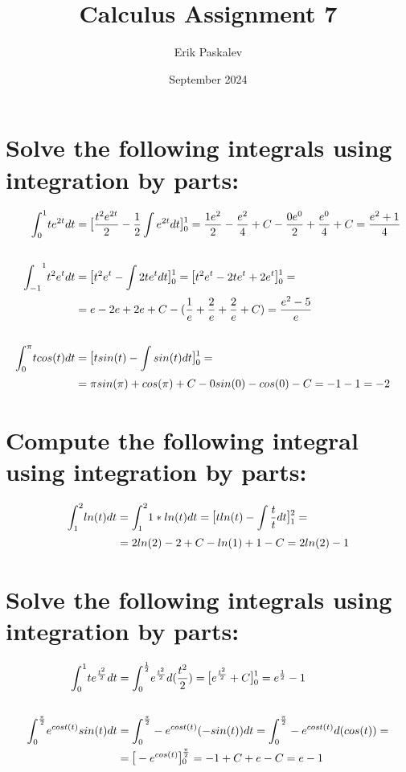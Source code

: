 \documentclass{article}
\title{Calculus Assignment 7}
\author{Erik Paskalev}
\date{September 2024}
\begin{document}
\maketitle

\section{\normalfont Solve the following integrals using integration by parts:}

\begin{equation}
\begin{split}
{\int_0}^1 te^{2t} dt & = \mathlarger{[}\frac{t^2e^{2t}}{2} - \frac{1}{2}\int e^{2t} dt\mathlarger{]}_0^1 = \frac{1e^2}{2} - \frac{e^2}{4} + C - \frac{0e^0}{2} + \frac{e^0}{4} + C = \frac{e^2 + 1}{4} \\ \\
{\int_{-1}}^1 t^2e^t dt & = \mathlarger{[}t^2e^t - \int 2te^t dt \mathlarger{]}_0^1 = \mathlarger{[}t^2e^t - 2te^t + 2e^t\mathlarger{]}_0^1 = \\ 
& = e - 2e + 2e + C - (\frac{1}{e} + \frac{2}{e} + \frac{2}{e} + C) = \frac{e^2 - 5}{e} \\ \\
{\int_0}^{\pi} tcos(t) dt & = \mathlarger{[}tsin(t) - \int sin(t) dt \mathlarger{]}_0^1 = \\ 
& = \pi sin(\pi) + cos(\pi) + C - 0sin(0) - cos(0) - C = -1 - 1 = -2
\end{split}    
\end{equation}

\section{\normalfont Compute the following integral using integration by parts:}

\begin{equation}
\begin{split}
{\int_1}^2 ln(t) dt & = {\int_1}^2 1*ln(t) dt = \mathlarger{[} tln(t) - \int \frac{t}{t} dt \mathlarger{]}_1^2 = \\ 
& = 2ln(2) - 2 + C - ln(1) + 1 - C = 2ln(2) - 1
\end{split}
\end{equation}

\section{\normalfont Solve the following integrals using integration by parts:}

\begin{equation}
\begin{split}
{\int_0}^1 te^{\frac{t^2}{2}} dt & = {\int_0}^{\frac{1}{2}} e^{\frac{t^2}{2}} d(\frac{t^2}{2}) = \mathlarger{[} e^{\frac{t^2}{2}} + C \mathlarger{]}_0^1 = e^{\frac{1}{2}} - 1 \\ \\
{\int_0}^{\frac{\pi}{2}} e^{cost(t)}sin(t) dt & = {\int_0}^{\frac{\pi}{2}} -e^{cost(t)} (-sin(t))dt = {\int_0}^{\frac{\pi}{2}} -e^{cost(t)} d(cos(t)) = \\
& = \mathlarger{[} -e^{cos(t)} \mathlarger{]}_0^{\frac{\pi}{2}} = -1 + C + e - C = e - 1
\end{split}
\end{equation}
\end{document}
